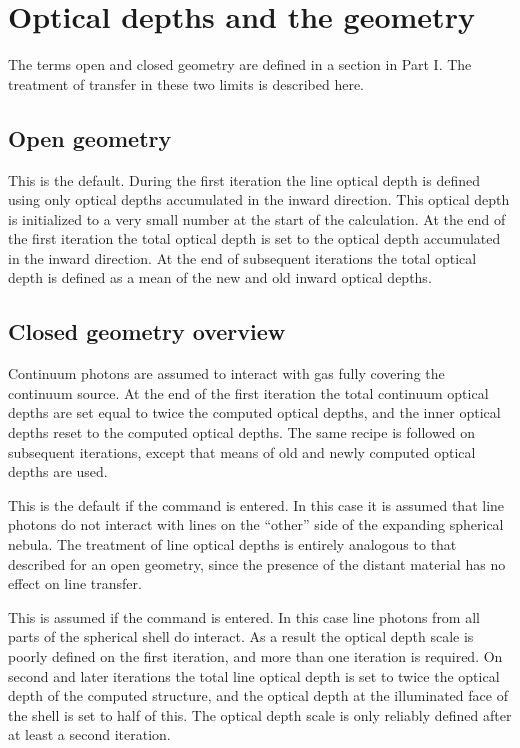 \section{Optical depths and the geometry }

The terms open and closed geometry are defined in a section in Part I.
The treatment of transfer in these two limits is described here.

\subsection{Open geometry }

This is the default.  During the first iteration the line optical depth
is defined using only optical depths accumulated in the inward direction.
This optical depth is initialized to a very small number at the start of
the calculation.
At the end of the first iteration the total optical depth
is set to the optical depth accumulated in the inward direction.
At the
end of subsequent iterations the total optical depth is defined as a mean
of the new and old inward optical depths.

\subsection{Closed geometry overview }

Continuum photons are assumed to interact with gas fully covering the
continuum source.  At the end of the first iteration the total continuum
optical depths are set equal to twice the computed optical depths, and the
inner optical depths reset to the computed optical depths.
The same recipe
is followed on subsequent iterations, except that means of old and newly
computed optical depths are used.

  This is the default if the
 command
is entered.  In this case it is assumed that line photons do not interact
with lines on the ``other'' side of the expanding spherical nebula.  The
treatment of line optical depths is entirely analogous to that described
for an open geometry, since the presence of the distant material has no
effect on line transfer.

  This is assumed if the  command
is entered.
In this case line photons from all parts of the spherical shell
do interact.
As a result the optical depth scale is poorly defined on the
first iteration, and more than one iteration is required.
On second and
later iterations the total line optical depth is set to twice the optical
depth of the computed structure, and the optical depth at the illuminated
face of the shell is set to half of this.
The optical depth scale is only
reliably defined after at least a second iteration.

